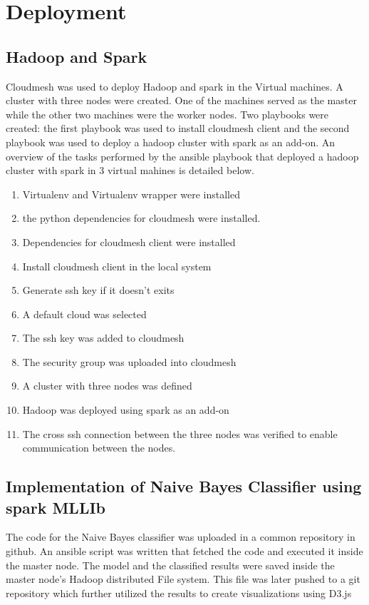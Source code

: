 \documentclass[9pt,twocolumn,twoside]{../../styles/osajnl}
\begin{document}
\section{Deployment}
\subsection{Hadoop and Spark}
Cloudmesh was used to deploy Hadoop and spark in the Virtual machines. A cluster with three nodes were created. One of the machines served as the master while the other two machines were the worker nodes. Two playbooks were created: the first playbook was used to install cloudmesh client and the second playbook was used to deploy a hadoop cluster with spark as an add-on. An overview of the tasks performed by the ansible playbook  that deployed a hadoop cluster with spark in 3 virtual mahines is detailed below.
\begin{enumerate}
    \item Virtualenv and Virtualenv wrapper were installed
    \item the python dependencies for cloudmesh were installed.
    \item Dependencies for cloudmesh client were installed
    \item Install cloudmesh client in the local system
    \item Generate ssh key if it doesn't exits
    \item A default cloud was selected
    \item The ssh key was added to cloudmesh
    \item The security group was uploaded into cloudmesh
    \item A cluster with three nodes was defined 
    \item Hadoop was deployed using spark as an add-on 
    \item The cross ssh connection between the three nodes was verified to enable communication between the nodes.
\end{enumerate}

\subsection{Implementation of Naive Bayes Classifier using spark MLLIb}
The code for the Naive Bayes classifier was uploaded in a common repository in github. An ansible script was written that fetched the code and executed it inside the master node. The model and the classified results were saved inside the master node's Hadoop distributed File system. This file was later pushed to a git repository which further utilized the results to create visualizations using D3.js
\end{document}

